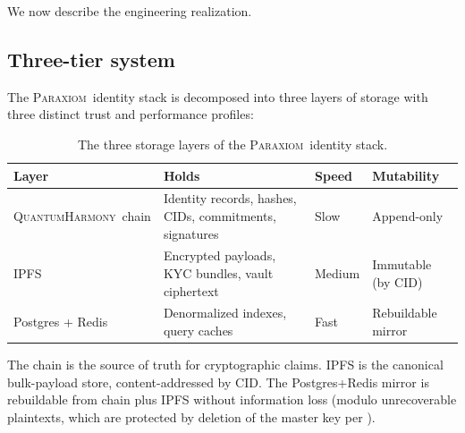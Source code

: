 \documentclass[11pt,a4paper,parskip=half-,DIV=12,headings=standardclasses]{scrartcl}
\theoremstyle{ncthm}
\theoremstyle{ncdef}
\newcommand{\paraxiom}{\textsc{Paraxiom}}
\newcommand{\qh}{\textsc{QuantumHarmony}}
\begin{document}
We now describe the engineering realization.

\subsection{Three-tier system}

The \paraxiom\ identity stack is decomposed into three layers of
storage with three distinct trust and performance profiles:

\begin{table}[h]
\centering
\begin{tabular}{@{}llll@{}}
\toprule
\textsf{Layer} & \textsf{Holds} & \textsf{Speed} & \textsf{Mutability}\\
\midrule
\qh\ chain & Identity records, hashes, CIDs, commitments, signatures & Slow & Append-only\\
IPFS & Encrypted payloads, KYC bundles, vault ciphertext & Medium & Immutable (by CID)\\
Postgres + Redis & Denormalized indexes, query caches & Fast & Rebuildable mirror\\
\bottomrule
\end{tabular}
\caption{The three storage layers of the \paraxiom\ identity stack.}
\label{tab:three-tier}
\end{table}

The chain is the source of truth for cryptographic claims. IPFS is
the canonical bulk-payload store, content-addressed by CID. The
Postgres+Redis mirror is rebuildable from chain plus IPFS without
information loss (modulo unrecoverable plaintexts, which are protected
by deletion of the master key per ).
\end{document}
